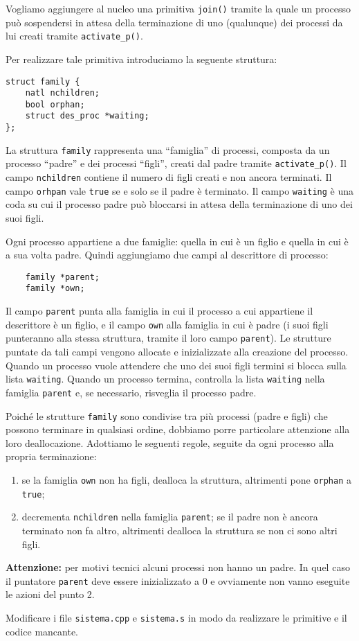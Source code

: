 Vogliamo aggiungere al nucleo una primitiva \verb|join()| tramite la quale un processo
pu\`o sospendersi in attesa della terminazione di uno (qualunque) dei processi da lui
creati tramite \verb|activate_p()|.

Per realizzare tale primitiva introduciamo la seguente struttura:

\begin{verbatim}
struct family {
    natl nchildren;
    bool orphan;
    struct des_proc *waiting;
};
\end{verbatim}

La struttura \verb|family| rappresenta una ``famiglia'' di processi, composta da un processo ``padre'' e dei processi ``figli'', creati dal padre tramite \verb|activate_p()|.
Il campo \verb|nchildren| contiene il numero di figli creati e non ancora terminati.
Il campo \verb|orhpan| vale \verb|true| se e solo se il padre \`e terminato.
Il campo \verb|waiting| \`e una coda su cui il processo padre pu\`o bloccarsi in attesa della
terminazione di uno dei suoi figli.

Ogni processo appartiene a due famiglie: quella in cui \`e un figlio e quella in cui \`e a sua volta padre. Quindi aggiungiamo due campi al descrittore di processo:

\begin{verbatim}
    family *parent;
    family *own;
\end{verbatim}

Il campo \verb|parent| punta alla famiglia in cui il processo a cui appartiene il descrittore
\`e un figlio, e il campo \verb|own| alla famiglia in cui \`e padre
(i suoi figli punteranno alla stessa struttura, tramite il loro campo \verb|parent|).
Le strutture puntate da tali campi vengono allocate e inizializzate alla creazione del processo.
Quando un processo vuole attendere che uno dei suoi figli termini si blocca sulla lista \verb|waiting|.
Quando un processo termina, controlla la lista \verb|waiting| nella
famiglia \verb|parent| e, se necessario, risveglia il processo padre.

Poich\'e le strutture \verb|family| sono condivise tra pi\`u processi
(padre e figli) che possono terminare in qualsiasi ordine,
dobbiamo porre particolare attenzione alla loro deallocazione.
Adottiamo le seguenti regole, seguite da ogni processo
alla propria terminazione:
\begin{enumerate}
\item se la famiglia \verb|own| non ha figli, dealloca la struttura, altrimenti pone \verb|orphan|
	a \verb|true|;
\item decrementa \verb|nchildren| nella famiglia \verb|parent|; se il padre non \`e ancora
  terminato non fa altro, altrimenti dealloca la struttura se non ci sono altri figli.
\end{enumerate}
{\bf Attenzione:} per motivi tecnici alcuni processi non hanno un padre. In quel caso
il puntatore \verb|parent| deve essere inizializzato a 0 e ovviamente non vanno eseguite
le azioni del punto 2.

Modificare i file \verb|sistema.cpp| e \verb|sistema.s| in modo da realizzare le primitive e il codice mancante.
